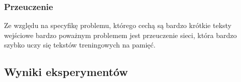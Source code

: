 \subsubsection{Przeuczenie}
Ze względu na specyfikę problemu, którego cechą są bardzo krótkie teksty wejściowe bardzo poważnym 
problemem jest przeuczenie sieci, która
bardzo szybko uczy się tekstów treningowych na pamięć. 

\subsection{Wyniki eksperymentów}

